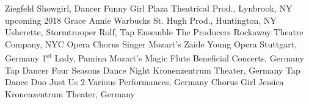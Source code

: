 \begin{cventries}
  \cventrytabb %
    {Ziegfeld Showgirl, Dancer}%
    {Funny Girl}%
    {Plaza Theatrical Prod., Lynbrook, NY}%
    {upcoming 2018} %
  \cventrytab %
    {Grace}%
    {Annie Warbucks}%
    {St. Hugh Prod., Huntington, NY}%
    {} %
  \cventrytab 
    {Usherette, Stormtrooper Rolf, Tap Ensemble}%
    {The Producers}%
    {Rockaway Theatre Company, NYC}%
    {} %
  \cventrytab
    {Opera Chorus Singer}%
    {Mozart's Zaide}%
    {Young Opera Stuttgart, Germany}%
    {}
  \cventrytab
    {1\textsuperscript{st} Lady, Pamina}
    {Mozart's Magic Flute}
    {Beneficial Concerts, Germany}
    {}
  \cventrytab
    {Tap Dancer}
    {Four Seasons Dance Night}
    {Kronenzentrum Theater, Germany}
    {} 
  \cventrytab
    {Tap Dance Duo}
    {Just Us 2}
    {Various Performances, Germany}
    {}
  \cventrytab
    {Chorus Girl}
    {Jessica}
    {Kronenzentrum Theater, Germany}
    {}
\end{cventries}
